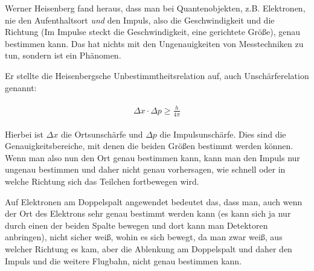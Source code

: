 Werner Heisenberg fand heraus, dass man bei Quantenobjekten, z.B. Elektronen, nie den Aufenthaltsort \emph{und} den Impuls, also die Geschwindigkeit und die Richtung (Im Impulse steckt die Geschwindigkeit, eine gerichtete Größe), genau bestimmen kann. Das hat nichts mit den Ungenauigkeiten von Messtechniken zu tun, sondern ist ein Phänomen.

Er stellte die Heisenbergsche Unbestimmtheitsrelation auf, auch Unschärferelation genannt:

\begin{align}
\begin{split}
	\Delta x \cdot \Delta p \ge \frac{h}{4\pi}
\end{split}
\end{align}

Hierbei ist $\Delta x$ die Ortsunschärfe und $\Delta p$ die Impulsunschärfe. Dies sind die Genauigkeitsbereiche, mit denen die beiden Größen bestimmt werden können. Wenn man also nun den Ort genau bestimmen kann, kann man den Impuls nur ungenau bestimmen und daher nicht genau vorhersagen, wie schnell oder in welche Richtung sich das Teilchen fortbewegen wird.

Auf Elektronen am Doppelspalt angewendet bedeutet das, dass man, auch wenn der Ort des Elektrons sehr genau bestimmt werden kann (es kann sich ja nur durch einen der beiden Spalte bewegen und dort kann man Detektoren anbringen), nicht sicher weiß, wohin es sich bewegt, da man zwar weiß, aus welcher Richtung es kam, aber die Ablenkung am Doppelspalt und daher den Impuls und die weitere Flugbahn, nicht genau bestimmen kann.